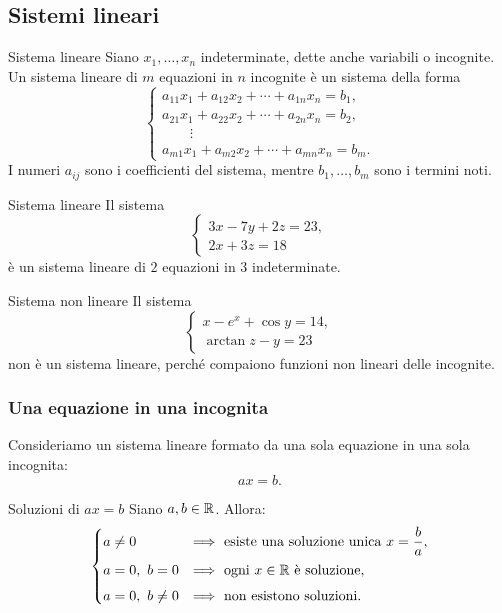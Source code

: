 \documentclass[a4paper]{article}
\begin{document}
\subsection{Sistemi lineari}

\begin{snippetdefinition}{Sistema lineare}
    Siano \(x_1,\ldots,x_n\) indeterminate, dette anche variabili o incognite. Un sistema lineare di \(m\) equazioni in \(n\) incognite è un sistema della forma
    \[
        \begin{cases}
            a_{11}x_1+a_{12}x_2+\cdots+a_{1n}x_n=b_1,\\
            a_{21}x_1+a_{22}x_2+\cdots+a_{2n}x_n=b_2,\\
            \qquad\vdots\\
            a_{m1}x_1+a_{m2}x_2+\cdots+a_{mn}x_n=b_m.
        \end{cases}
    \]
    I numeri \(a_{ij}\) sono i coefficienti del sistema, mentre \(b_1,\ldots,b_m\) sono i termini noti.
\end{snippetdefinition}

\begin{snippetexample}{Sistema lineare}
    Il sistema
    \[
        \begin{cases}
            3x-7y+2z=23,\\
            2x+3z=18
        \end{cases}
    \]
    è un sistema lineare di \(2\) equazioni in \(3\) indeterminate.
\end{snippetexample}

\begin{snippetexample}{Sistema non lineare}
    Il sistema
    \[
        \begin{cases}
            x-e^x+\cos y=14,\\
            \arctan z-y=23
        \end{cases}
    \]
    non è un sistema lineare, perché compaiono funzioni non lineari delle incognite.
\end{snippetexample}

\subsubsection{Una equazione in una incognita}

Consideriamo un sistema lineare formato da una sola equazione in una sola incognita:
\[
    ax=b.
\]

\begin{snippetproposition}{Soluzioni di \(ax=b\)}
    Siano \(a,b\in\mathbb{R}\). Allora:
    \[
        \begin{cases}
            a\neq 0 &\Longrightarrow \text{ esiste una soluzione unica } x=\dfrac{b}{a},\\[6pt]
            a=0,\ b=0 &\Longrightarrow \text{ ogni } x\in\mathbb{R} \text{ è soluzione},\\[4pt]
            a=0,\ b\neq 0 &\Longrightarrow \text{ non esistono soluzioni}.
        \end{cases}
    \]
\end{snippetproposition}
\end{document}
